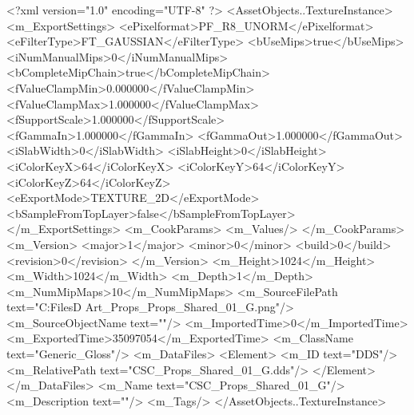 <?xml version="1.0" encoding="UTF-8" ?>
<AssetObjects..TextureInstance>
	<m_ExportSettings>
		<ePixelformat>PF_R8_UNORM</ePixelformat>
		<eFilterType>FT_GAUSSIAN</eFilterType>
		<bUseMips>true</bUseMips>
		<iNumManualMips>0</iNumManualMips>
		<bCompleteMipChain>true</bCompleteMipChain>
		<fValueClampMin>0.000000</fValueClampMin>
		<fValueClampMax>1.000000</fValueClampMax>
		<fSupportScale>1.000000</fSupportScale>
		<fGammaIn>1.000000</fGammaIn>
		<fGammaOut>1.000000</fGammaOut>
		<iSlabWidth>0</iSlabWidth>
		<iSlabHeight>0</iSlabHeight>
		<iColorKeyX>64</iColorKeyX>
		<iColorKeyY>64</iColorKeyY>
		<iColorKeyZ>64</iColorKeyZ>
		<eExportMode>TEXTURE_2D</eExportMode>
		<bSampleFromTopLayer>false</bSampleFromTopLayer>
	</m_ExportSettings>
	<m_CookParams>
		<m_Values/>
	</m_CookParams>
	<m_Version>
		<major>1</major>
		<minor>0</minor>
		<build>0</build>
		<revision>0</revision>
	</m_Version>
	<m_Height>1024</m_Height>
	<m_Width>1024</m_Width>
	<m_Depth>1</m_Depth>
	<m_NumMipMaps>10</m_NumMipMaps>
	<m_SourceFilePath text="C:\Users\Shadow\Desktop\Working Files\3D Art\Textures\CSC_Props\Current\textures\CSC_Props_Shared_01_G.png"/>
	<m_SourceObjectName text=""/>
	<m_ImportedTime>0</m_ImportedTime>
	<m_ExportedTime>35097054</m_ExportedTime>
	<m_ClassName text="Generic_Gloss"/>
	<m_DataFiles>
		<Element>
			<m_ID text="DDS"/>
			<m_RelativePath text="CSC_Props_Shared_01_G.dds"/>
		</Element>
	</m_DataFiles>
	<m_Name text="CSC_Props_Shared_01_G"/>
	<m_Description text=""/>
	<m_Tags/>
</AssetObjects..TextureInstance>

